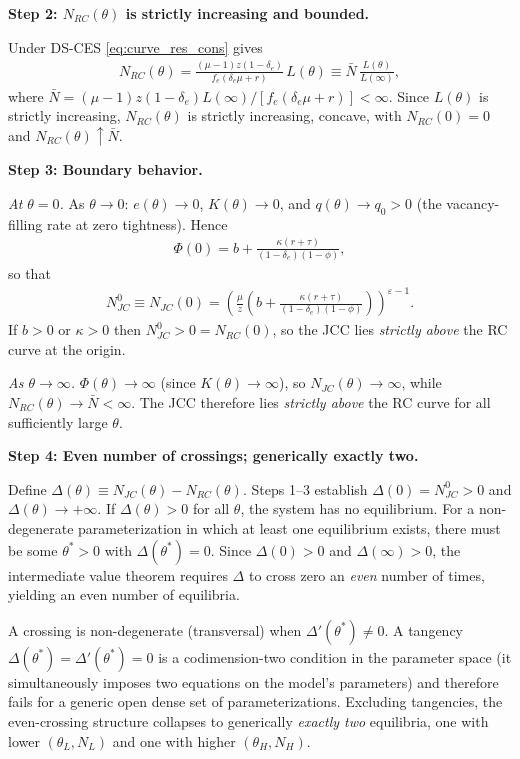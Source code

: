 \documentclass[authoryear, review, 12pt]{elsarticle}
\begin{document}
\medskip\noindent\textbf{Step 2: $N_{RC}(\theta)$ is strictly increasing and bounded.}

Under DS-CES \eqref{eq:curve_res_cons} gives
\begin{align}
  N_{RC}(\theta)
  =\frac{(\mu-1)z(1-\delta_e)}{f_e(\delta_e\mu+r)}\,L(\theta)
  \equiv \bar{N}\,\frac{L(\theta)}{L(\infty)},
\end{align}
where $\bar{N}=(\mu-1)z(1-\delta_e)L(\infty)/[f_e(\delta_e\mu+r)]<\infty$.
Since $L(\theta)$ is strictly increasing, $N_{RC}(\theta)$ is strictly
increasing, concave, with $N_{RC}(0)=0$ and $N_{RC}(\theta)\uparrow\bar{N}$.

\medskip\noindent\textbf{Step 3: Boundary behavior.}

\emph{At $\theta=0$.}
As $\theta\to 0$: $e(\theta)\to 0$, $K(\theta)\to 0$, and
$q(\theta)\to q_0>0$ (the vacancy-filling rate at zero tightness).  Hence
\begin{align}
  \Phi(0) = b + \frac{\kappa(r+\tau)}{(1-\delta_e)(1-\phi)},
\end{align}
so that
\begin{align}
  N_{JC}^0\equiv N_{JC}(0)
  =\left(\frac{\mu}{z}
    \left(b+\frac{\kappa(r+\tau)}{(1-\delta_e)(1-\phi)}\right)
  \right)^{\varepsilon-1}.
\end{align}
If $b>0$ or $\kappa>0$ then $N_{JC}^0>0=N_{RC}(0)$, so the JCC lies
\emph{strictly above} the RC curve at the origin.

\emph{As $\theta\to\infty$.}
$\Phi(\theta)\to\infty$ (since $K(\theta)\to\infty$), so
$N_{JC}(\theta)\to\infty$, while $N_{RC}(\theta)\to\bar{N}<\infty$.
The JCC therefore lies \emph{strictly above} the RC curve for all
sufficiently large $\theta$.

\medskip\noindent\textbf{Step 4: Even number of crossings; generically exactly two.}

Define $\Delta(\theta)\equiv N_{JC}(\theta)-N_{RC}(\theta)$.  Steps 1--3
establish $\Delta(0)=N_{JC}^0>0$ and $\Delta(\theta)\to+\infty$.  If
$\Delta(\theta)>0$ for all $\theta$, the system has no equilibrium.  For
a non-degenerate parameterization in which at least one equilibrium exists,
there must be some $\theta^*>0$ with $\Delta(\theta^*)=0$.  Since
$\Delta(0)>0$ and $\Delta(\infty)>0$, the intermediate value theorem
requires $\Delta$ to cross zero an \emph{even} number of times, yielding
an even number of equilibria.

A crossing is non-degenerate (transversal) when $\Delta'(\theta^*)\neq 0$.
A tangency $\Delta(\theta^*)=\Delta'(\theta^*)=0$ is a codimension-two
condition in the parameter space (it simultaneously imposes two equations
on the model's parameters) and therefore fails for a generic open dense
set of parameterizations.  Excluding tangencies, the even-crossing
structure collapses to generically \emph{exactly two} equilibria, one
with lower $(\theta_L,N_L)$ and one with higher $(\theta_H,N_H)$.
\end{document}

